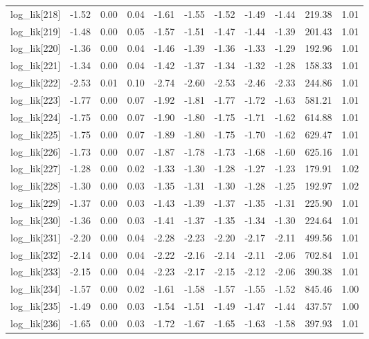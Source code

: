 \begin{table}[ht]
\begin{tabular}{rrrrrrrrrrr}
  log\_lik[218] & -1.52 & 0.00 & 0.04 & -1.61 & -1.55 & -1.52 & -1.49 & -1.44 & 219.38 & 1.01 \\ 
  log\_lik[219] & -1.48 & 0.00 & 0.05 & -1.57 & -1.51 & -1.47 & -1.44 & -1.39 & 201.43 & 1.01 \\ 
  log\_lik[220] & -1.36 & 0.00 & 0.04 & -1.46 & -1.39 & -1.36 & -1.33 & -1.29 & 192.96 & 1.01 \\ 
  log\_lik[221] & -1.34 & 0.00 & 0.04 & -1.42 & -1.37 & -1.34 & -1.32 & -1.28 & 158.33 & 1.01 \\ 
  log\_lik[222] & -2.53 & 0.01 & 0.10 & -2.74 & -2.60 & -2.53 & -2.46 & -2.33 & 244.86 & 1.01 \\ 
  log\_lik[223] & -1.77 & 0.00 & 0.07 & -1.92 & -1.81 & -1.77 & -1.72 & -1.63 & 581.21 & 1.01 \\ 
  log\_lik[224] & -1.75 & 0.00 & 0.07 & -1.90 & -1.80 & -1.75 & -1.71 & -1.62 & 614.88 & 1.01 \\ 
  log\_lik[225] & -1.75 & 0.00 & 0.07 & -1.89 & -1.80 & -1.75 & -1.70 & -1.62 & 629.47 & 1.01 \\ 
  log\_lik[226] & -1.73 & 0.00 & 0.07 & -1.87 & -1.78 & -1.73 & -1.68 & -1.60 & 625.16 & 1.01 \\ 
  log\_lik[227] & -1.28 & 0.00 & 0.02 & -1.33 & -1.30 & -1.28 & -1.27 & -1.23 & 179.91 & 1.02 \\ 
  log\_lik[228] & -1.30 & 0.00 & 0.03 & -1.35 & -1.31 & -1.30 & -1.28 & -1.25 & 192.97 & 1.02 \\ 
  log\_lik[229] & -1.37 & 0.00 & 0.03 & -1.43 & -1.39 & -1.37 & -1.35 & -1.31 & 225.90 & 1.01 \\ 
  log\_lik[230] & -1.36 & 0.00 & 0.03 & -1.41 & -1.37 & -1.35 & -1.34 & -1.30 & 224.64 & 1.01 \\ 
  log\_lik[231] & -2.20 & 0.00 & 0.04 & -2.28 & -2.23 & -2.20 & -2.17 & -2.11 & 499.56 & 1.01 \\ 
  log\_lik[232] & -2.14 & 0.00 & 0.04 & -2.22 & -2.16 & -2.14 & -2.11 & -2.06 & 702.84 & 1.01 \\ 
  log\_lik[233] & -2.15 & 0.00 & 0.04 & -2.23 & -2.17 & -2.15 & -2.12 & -2.06 & 390.38 & 1.01 \\ 
  log\_lik[234] & -1.57 & 0.00 & 0.02 & -1.61 & -1.58 & -1.57 & -1.55 & -1.52 & 845.46 & 1.00 \\ 
  log\_lik[235] & -1.49 & 0.00 & 0.03 & -1.54 & -1.51 & -1.49 & -1.47 & -1.44 & 437.57 & 1.00 \\ 
  log\_lik[236] & -1.65 & 0.00 & 0.03 & -1.72 & -1.67 & -1.65 & -1.63 & -1.58 & 397.93 & 1.01 \\ 

\end{tabular}
\end{table}
